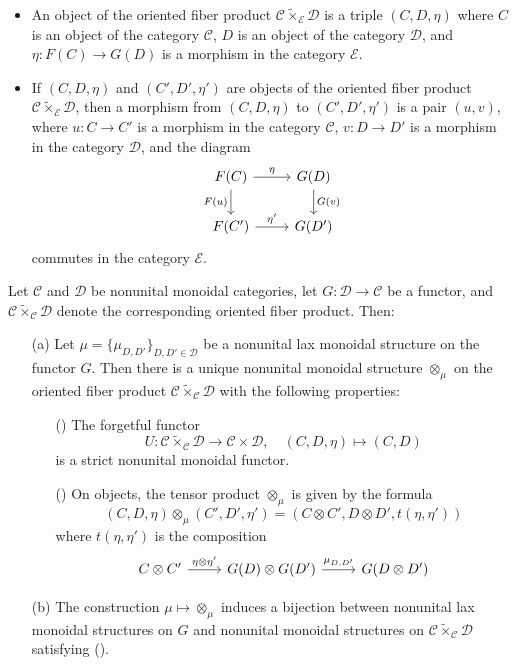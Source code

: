 \begin{itemize}
\item An object of the oriented fiber product $\mathcal{C}\tilde{\times}_{\mathcal{E}}\mathcal{D}$ is a triple $(C,D,\eta)$ where $C$ is an object of the category $\mathcal{C}$, $D$ is an object of the category $\mathcal{D}$, and $\eta:F(C)\to G(D)$ is a morphism in the category $\mathcal{E}$.
\item If $(C,D,\eta)$ and $(C',D',\eta')$ are objects of the oriented fiber product $\mathcal{C}\tilde{\times}_{\mathcal{E}}\mathcal{D}$, then a morphism from $(C,D,\eta)$ to $(C',D',\eta')$ is a pair $(u,v)$, where $u:C\to C'$ is a morphism in the category $\mathcal{C}$, $v:D\to D'$ is a morphism in the category $\mathcal{D}$, and the diagram
\[\begin{tikzcd}
F(C)\ar[r,"\eta"]\ar[d,swap,"F(u)"]&G(D)\ar[d,"G(v)"]\\
F(C')\ar[r,"\eta'"]&G(D')
\end{tikzcd}\]
commutes in the category $\mathcal{E}$.
\end{itemize}
\begin{proposition}\label{monoidal cat nonunital lax functor and oriented product}
Let $\mathcal{C}$ and $\mathcal{D}$ be nonunital monoidal categories, let $G:\mathcal{D}\to\mathcal{C}$ be a functor, and $\mathcal{C}\tilde{\times}_\mathcal{C}\mathcal{D}$ denote the corresponding oriented fiber product. Then:
\begin{itemize}
\item[(a)] Let $\mu=\{\mu_{D,D'}\}_{D,D'\in\mathcal{D}}$ be a nonunital lax monoidal structure on the functor $G$. Then there is a unique nonunital monoidal structure $\otimes_\mu$ on the oriented fiber product $\mathcal{C}\tilde{\times}_\mathcal{C}\mathcal{D}$ with the following properties:
\begin{itemize}
\item[(\rmnum{1})] The forgetful functor
\[U:\mathcal{C}\tilde{\times}_\mathcal{C}\mathcal{D}\to\mathcal{C}\times\mathcal{D},\quad (C,D,\eta)\mapsto(C,D)\]
is a strict nonunital monoidal functor.
\item[(\rmnum{2})] On objects, the tensor product $\otimes_\mu$ is given by the formula
\[(C,D,\eta)\otimes_\mu(C',D',\eta')=(C\otimes C',D\otimes D',t(\eta,\eta'))\]
where $t(\eta,\eta')$ is the composition
\[\begin{tikzcd}
C\otimes C'\ar[r,"\eta\otimes\eta'"]&G(D)\otimes G(D')\ar[r,"\mu_{D,D'}"]&G(D\otimes D')
\end{tikzcd}\]
\end{itemize}
\item[(b)] The construction $\mu\mapsto\otimes_\mu$ induces a bijection between nonunital lax monoidal structures on $G$ and nonunital monoidal structures on $\mathcal{C}\tilde{\times}_{\mathcal{C}}\mathcal{D}$ satisfying ().
\end{itemize}
\end{proposition}
